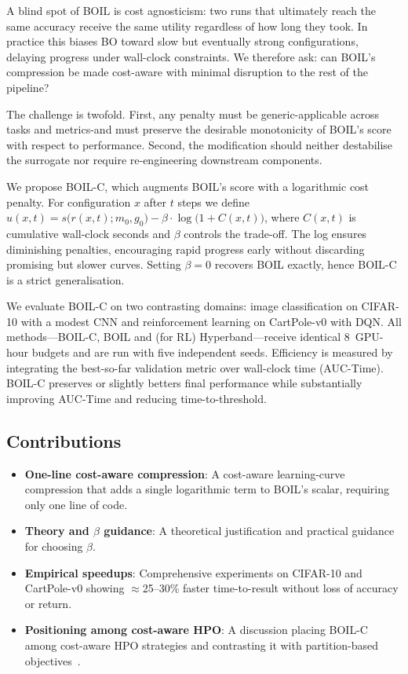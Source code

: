 \documentclass{article} %
\begin{document}
A blind spot of BOIL is cost agnosticism: two runs that ultimately reach the same accuracy receive the same utility regardless of how long they took. In practice this biases BO toward slow but eventually strong configurations, delaying progress under wall-clock constraints. We therefore ask: can BOIL's compression be made cost-aware with minimal disruption to the rest of the pipeline?

The challenge is twofold. First, any penalty must be generic-applicable across tasks and metrics-and must preserve the desirable monotonicity of BOIL's score with respect to performance. Second, the modification should neither destabilise the surrogate nor require re-engineering downstream components.

We propose BOIL-C, which augments BOIL's score with a logarithmic cost penalty. For configuration \(x\) after \(t\) steps we define \(u(x,t) = s\big(r(x,t); m_0, g_0\big) - \beta\cdot \log\big(1 + C(x,t)\big)\), where \(C(x,t)\) is cumulative wall-clock seconds and \(\beta\) controls the trade-off. The log ensures diminishing penalties, encouraging rapid progress early without discarding promising but slower curves. Setting \(\beta=0\) recovers BOIL exactly, hence BOIL-C is a strict generalisation.

We evaluate BOIL-C on two contrasting domains: image classification on CIFAR-10 with a modest CNN and reinforcement learning on CartPole-v0 with DQN\@. All methods---BOIL-C, BOIL and (for RL) Hyperband---receive identical 8~GPU-hour budgets and are run with five independent seeds. Efficiency is measured by integrating the best-so-far validation metric over wall-clock time (AUC-Time). BOIL-C preserves or slightly betters final performance while substantially improving AUC-Time and reducing time-to-threshold.

\subsection{Contributions}
\begin{itemize}
  \item \textbf{One-line cost-aware compression}: A cost-aware learning-curve compression that adds a single logarithmic term to BOIL's scalar, requiring only one line of code.
  \item \textbf{Theory and \(\beta\) guidance}: A theoretical justification and practical guidance for choosing \(\beta\).
  \item \textbf{Empirical speedups}: Comprehensive experiments on CIFAR-10 and CartPole-v0 showing \(\approx\)25--30\% faster time-to-result without loss of accuracy or return.
  \item \textbf{Positioning among cost-aware HPO}: A discussion placing BOIL-C among cost-aware HPO strategies and contrasting it with partition-based objectives~\cite{mlodozeniec-2023-hyperparameter}.
\end{itemize}
\end{document}
